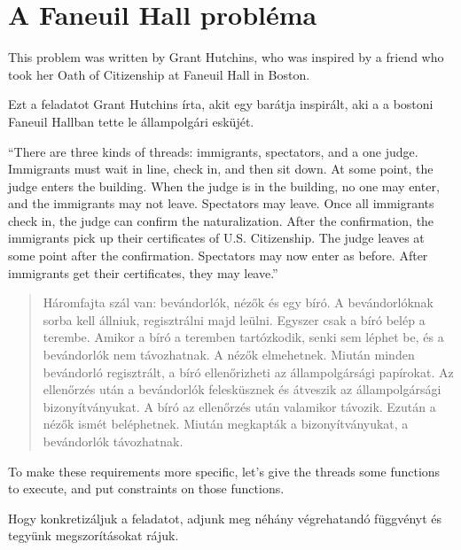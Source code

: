 \documentclass{book}
\newcommand{\clearemptydoublepage}{\newpage\cleardoublepage}
\begin{document}
\clearemptydoublepage
\section{A Faneuil Hall probléma}

This problem was written by Grant Hutchins, who was inspired
by a friend who took her
Oath of Citizenship at Faneuil Hall in Boston.

Ezt a feladatot Grant Hutchins írta, akit egy barátja inspirált,
aki a a bostoni Faneuil Hallban tette le állampolgári esküjét.

``There are three kinds of threads: immigrants, spectators, and a one
judge.  Immigrants must wait in line, check in, and then sit down.  At
some point, the judge enters the building.  When the judge is in the
building, no one may enter, and the immigrants may not leave.
Spectators may leave.  Once all immigrants check in, the judge can
confirm the naturalization.  After the confirmation, the immigrants
pick up their certificates of U.S. Citizenship.  The judge leaves at
some point after the confirmation.  Spectators may now enter as
before.  After immigrants get their certificates, they may leave.''

\begin{quotation}
Háromfajta szál van: bevándorlók, nézők és egy bíró. A bevándorlóknak
sorba kell állniuk, regisztrálni majd leülni. Egyszer csak a bíró
belép a terembe. Amikor a bíró a teremben tartózkodik, senki sem
léphet be, és a bevándorlók nem távozhatnak. A nézők elmehetnek.
Miután minden bevándorló regisztrált, a bíró ellenőrizheti az
állampolgársági papírokat. Az ellenőrzés után a bevándorlók felesküsznek és
átveszik az állampolgársági bizonyítványukat. A bíró az ellenőrzés után
valamikor távozik. Ezután a nézők ismét beléphetnek. Miután megkapták
a bizonyítványukat, a bevándorlók távozhatnak.
\end{quotation}

To make these requirements more specific, let's give the threads
some functions to execute, and put constraints on those functions.

Hogy konkretizáljuk a feladatot, adjunk meg néhány végrehatandó
függvényt és tegyünk megszorításokat rájuk.
\end{document}
